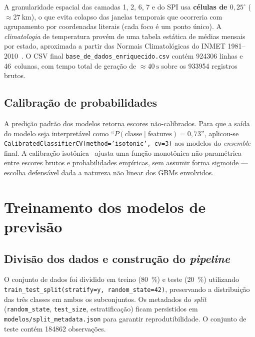 A granularidade espacial das camadas 1, 2, 6, 7 e do SPI usa \textbf{células de \(0{,}25^\circ\)} (\(\approx \SI{27}{\km}\)), o que evita colapso das janelas temporais que ocorreria com agrupamento por coordenadas literais (cada foco é um ponto único). A \emph{climatologia} de temperatura provém de uma tabela estática de médias mensais por estado, aproximada a partir das Normais Climatológicas do INMET 1981--2010~\cite{inmetnormais}. O CSV final \texttt{base\_de\_dados\_enriquecido.csv} contém \num{924306} linhas e 46~colunas, com tempo total de geração de \(\approx \SI{40}{\second}\) sobre os \num{933954} registros brutos.

\subsection{Calibração de probabilidades}
\label{subsec:metod_calibracao}

A predição padrão dos modelos retorna escores não-calibrados. Para que a saída do modelo seja interpretável como ``\(P(\text{classe} \mid \text{features}) = 0{,}73\)'', aplicou-se \texttt{CalibratedClassifierCV(method='isotonic', cv=3)} aos modelos do \emph{ensemble} final. A calibração isotônica~\cite{zadrozny2002transforming} ajusta uma função monotônica não-paramétrica entre escores brutos e probabilidades empíricas, sem assumir forma sigmoide --- escolha defensável dada a natureza não linear dos GBMs envolvidos.


\section{Treinamento dos modelos de previsão}
\label{sec:metod_treinamento}

\subsection{Divisão dos dados e construção do \emph{pipeline}}

O conjunto de dados foi dividido em treino (\SI{80}{\percent}) e teste (\SI{20}{\percent}) utilizando \texttt{train\_test\_split(stratify=y, random\_state=42)}, preservando a distribuição das três classes em ambos os subconjuntos. Os metadados do \emph{split} (\texttt{random\_state}, \texttt{test\_size}, estratificação) ficam persistidos em \texttt{modelos/split\_metadata.json} para garantir reprodutibilidade. O conjunto de teste contém \num{184862} observações.


